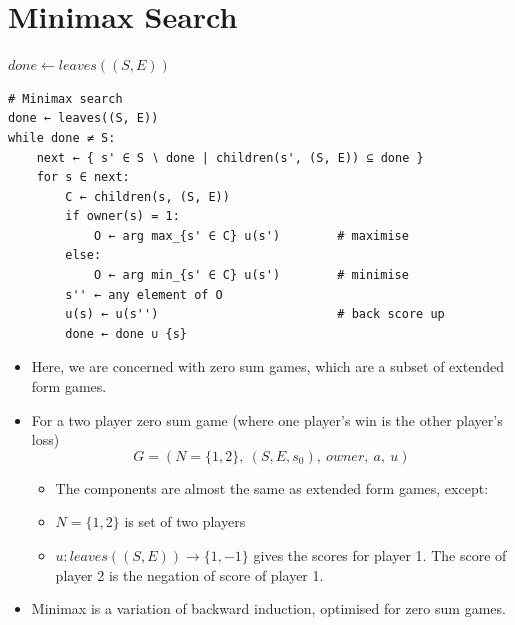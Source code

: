 \documentclass[12pt, a4paper]{article}
\begin{document}
\section{Minimax Search}
\begin{algorithm}[H]
\caption{Minimax search}

$done \leftarrow leaves((S, E))$\;
\end{algorithm}
\begin{Verbatim}
# Minimax search
done ← leaves((S, E))
while done ≠ S:
    next ← { s' ∈ S ∖ done | children(s', (S, E)) ⊆ done }
    for s ∈ next:
        C ← children(s, (S, E))
        if owner(s) = 1:
            O ← arg max_{s' ∈ C} u(s')        # maximise
        else:
            O ← arg min_{s' ∈ C} u(s')        # minimise
        s'' ← any element of O
        u(s) ← u(s'')                         # back score up
        done ← done ∪ {s}
\end{Verbatim}

\begin{itemize}
    \item Here, we are concerned with zero sum games, which are a subset of extended form games.
    \item For a two player zero sum game (where one player's win is the other player's loss)
    \[G = (N = \{1, 2\},\: (S, E, s_0),\: owner,\: a,\: u)\]
    \begin{itemize}
        \item The components are almost the same as extended form games, except:
        \item $N = \{1,2\}$ is set of two players
        \item $u: leaves((S, E))\rightarrow \{1,-1\}$ gives the scores for player 1.
        The score of player 2 is the negation of score of player 1. 
    \end{itemize}
    \item Minimax is a variation of backward induction, optimised for zero sum games.
\end{itemize}
\end{document}
